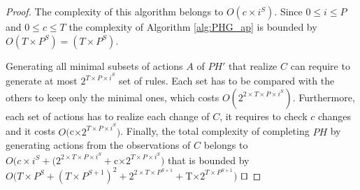 \begin{theorem}[Complexity]
\begin{proof}
		The complexity of this algorithm belongs to $O(c\times i^S)$.
		Since $0 \leq i \leq P$ and $0 \leq c \leq T$ the complexity of Algorithm \ref{alg:PHG_ap} is bounded by $O(T\times P^S) = (T\times P^S)$.
		
		Generating all minimal subsets of actions $A$ of $PH'$ that realize $C$ can require to generate at most $2^{T\times  P \times  i^S}$ set of rules.
		Each set has to be compared with the others to keep only the minimal ones, which costs $O(2^{2\times T\times  P \times  i^S})$.
		Furthermore, each set of actions has to realize each change of $C$, it requires to check $c$ changes and it costs $O($c$ \times  2^{T\times  P \times  i^S})$.
		Finally, the total complexity of completing $PH$ by generating actions from the observations of $C$ belongs to
		$O(c\times i^S + (2^{2\times T\times  P \times  i^S} + $c$ \times  2^{T\times  P \times  i^S})$ that is bounded by $O(T\times P^S + (T\times P^{S+1})^2 + 2^{2\times T\times P^{S+1}} + $T$ \times  2^{T\times  P^{S+1}})$
		$\qed$
	\end{proof}
\end{theorem}


%
